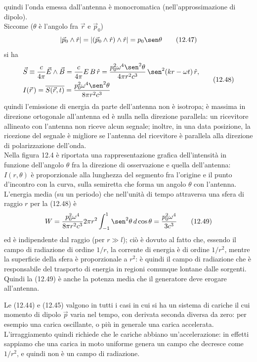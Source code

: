 quindi l'onda emessa dall'antenna \`e monocromatica (nell'approssimazione di
dipolo).\\
Siccome ($\theta$ \`e l'angolo fra $\vec r$ e $\vec p_0$)
\begin{equation}
  |\vec p_0\wedge\hat r|=|(\vec p_0\wedge\hat r)\wedge\hat r|=p_0\sen\theta
  \tag{12.47}
\end{equation}
si ha
\begin{equation}
  \begin{aligned}
    &\vec S\equiv\frac{c}{4\pi}\vec E\wedge\vec B
    =\frac{c}{4\pi}E\,B\,\hat r=\frac{p_0^2\omega^4\sen^2\theta}{4\pi r^2c^3}\,
    \sen^2(kr-\omega t)\,\hat r,\\
    &I(\vec r\,)=\overline{S(\vec r,t)}
    =\frac{p_0^2\omega^4\sen^2\theta}{8\pi r^2c^3}
  \end{aligned}
  \tag{12.48}
\end{equation}
quindi l'emissione di energia da parte dell'antenna non \`e isotropa; \`e
massima in direzione ortogonale all'antenna ed \`e nulla nella direzione
parallela: un ricevitore allineato con l'antenna non riceve alcun segnale;
inoltre, in una data posizione, la ricezione del segnale \`e migliore se
l'antenna del ricevitore \`e parallela alla direzione di polarizzazione
dell'onda.\\
Nella figura 12.4 \`e riportata una rappresentazione grafica dell'intensit\`a in
funzione dell'angolo $\theta$ fra la direzione di osservazione e quella
dell'antenna: $I(r,\theta)$ \`e proporzionale alla lunghezza del segmento fra
l'origine e il punto d'incontro con la curva, sulla semiretta che forma un
angolo $\theta$ con l'antenna.
L'energia media (su un periodo) che nell'unit\`a di tempo attraversa una sfera
di raggio $r$ per la (12.48) \`e
\begin{equation}
  W=\frac{p_0^2\omega^4}{8\pi r^2c^3}2\pi r^2
  \int_{-1}^1\sen^2\theta\,d\cos\theta=\frac{p_0^2\omega^4}{3c^3}
  \tag{12.49}
\end{equation}
ed \`e indipendente dal raggio (per $r\gg l$); ci\`o \`e dovuto al fatto che,
essendo il campo di radiazione di ordine $1/r$, la corrente di energia \`e di
ordine $1/r^2$, mentre la superficie della sfera \`e proporzionale a $r^2$: \`e
quindi il campo di radiazione che \`e responsabile del trasporto di energia in
regioni comunque lontane dalle sorgenti. Quindi la (12.49) \`e anche la potenza
media che il generatore deve erogare all'antenna.

Le (12.44) e (12.45) valgono in tutti i casi in cui si ha un sistema di cariche
il cui momento di dipolo $\vec p$ varia nel tempo, con derivata seconda diversa
da zero: per esempio una carica oscillante, o pi\`u in generale una carica
accelerata. L'irraggiamento quindi richiede che le cariche abbiano
un'accelerazione: in effetti sappiamo che una carica in moto uniforme genera un
campo che decresce come $1/r^2$, e quindi non \`e un campo di radiazione.

